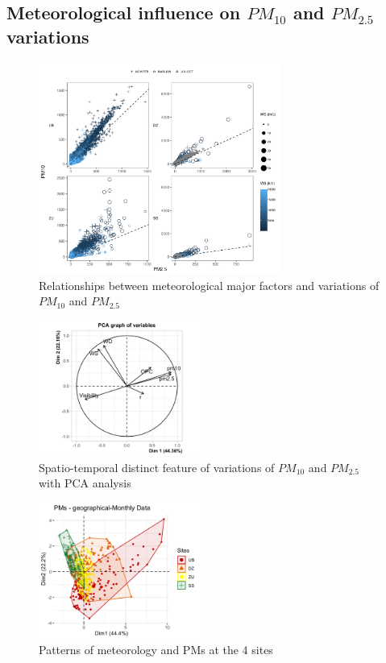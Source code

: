 \documentclass[
  11pt,
]{article}
\begin{document}
\newpage
\subsection{Meteorological influence on $PM_{10}$ and $PM_{2.5}$ variations}
\label{subsec2}

\begin{figure}
\centering
\includegraphics[width=3.125in,height=\textheight,keepaspectratio]{images/figure_6.png}
\caption{Relationships between meteorological major factors and
variations of \(PM_{10}\) and \(PM_{2.5}\)}
\end{figure}

\newpage

\begin{figure}
\centering
\includegraphics[width=2.08333in,height=\textheight,keepaspectratio]{images/figure_7.png}
\caption{Spatio-temporal distinct feature of variations of \(PM_{10}\)
and \(PM_{2.5}\) with PCA analysis}
\end{figure}

\begin{figure}
\centering
\includegraphics[width=2.08333in,height=\textheight,keepaspectratio]{images/figure_7b.png}
\caption{Patterns of meteorology and PMs at the 4 sites}
\end{figure}
\end{document}
